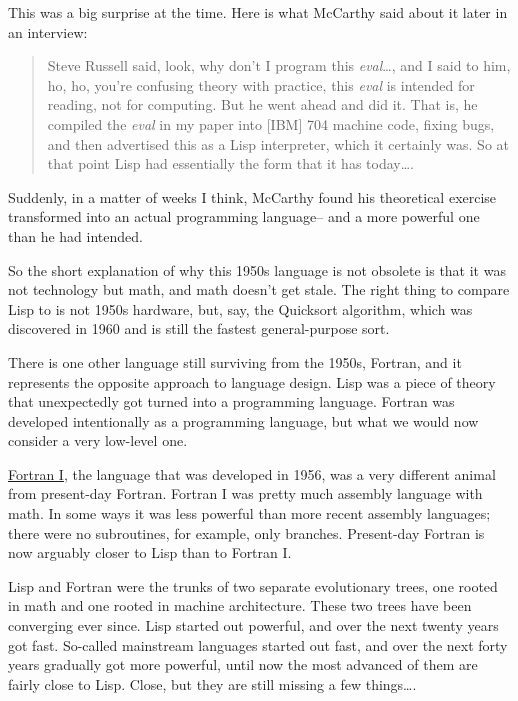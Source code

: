 \documentclass[12pt]{book}
\begin{document}
This was a big surprise at the time. Here is what McCarthy said about it
later in an interview:

\begin{quote}
Steve Russell said, look, why don't I program this \emph{eval}\ldots,
and I said to him, ho, ho, you're confusing theory with practice, this
\emph{eval} is intended for reading, not for computing. But he went
ahead and did it. That is, he compiled the \emph{eval} in my paper into
{[}IBM{]} 704 machine code, fixing bugs, and then advertised this as a
Lisp interpreter, which it certainly was. So at that point Lisp had
essentially the form that it has today\ldots.
\end{quote}

Suddenly, in a matter of weeks I think, McCarthy found his theoretical
exercise transformed into an actual programming language-- and a more
powerful one than he had intended.

So the short explanation of why this 1950s language is not obsolete is
that it was not technology but math, and math doesn't get stale. The
right thing to compare Lisp to is not 1950s hardware, but, say, the
Quicksort algorithm, which was discovered in 1960 and is still the
fastest general-purpose sort.

There is one other language still surviving from the 1950s, Fortran, and
it represents the opposite approach to language design. Lisp was a piece
of theory that unexpectedly got turned into a programming language.
Fortran was developed intentionally as a programming language, but what
we would now consider a very low-level one.

\href{history.html}{Fortran I}, the language that was developed in 1956,
was a very different animal from present-day Fortran. Fortran I was
pretty much assembly language with math. In some ways it was less
powerful than more recent assembly languages; there were no subroutines,
for example, only branches. Present-day Fortran is now arguably closer
to Lisp than to Fortran I.

Lisp and Fortran were the trunks of two separate evolutionary trees, one
rooted in math and one rooted in machine architecture. These two trees
have been converging ever since. Lisp started out powerful, and over the
next twenty years got fast. So-called mainstream languages started out
fast, and over the next forty years gradually got more powerful, until
now the most advanced of them are fairly close to Lisp. Close, but they
are still missing a few things\ldots.
\end{document}
